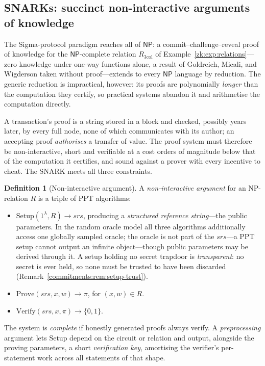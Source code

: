 \documentclass[11pt,a4paper]{article}
\theoremstyle{definition}
\newtheorem{definition}[theorem]{Definition}
\theoremstyle{remark}
\begin{document}
\subsection{SNARKs: succinct non-interactive arguments of knowledge}
\label{zk:subsec:snark}

The Sigma-protocol paradigm reaches all of \(\mathsf{NP}\): a
commit--challenge--reveal proof of knowledge for the
\(\mathsf{NP}\)-complete relation \(R_{3\mathrm{col}}\) of
Example~\ref{zk:exp:relations}---zero knowledge under one-way
functions alone, a result of Goldreich, Micali, and Wigderson taken
without proof---extends to every \(\mathsf{NP}\) language by
reduction. The generic reduction is impractical, however: its proofs
are polynomially \emph{longer} than the computation they certify, so
practical systems abandon it and arithmetise the computation
directly.

A transaction's proof is a string stored in a block and checked,
possibly years later, by every full node, none of which communicates
with its author; an accepting proof \emph{authorises} a transfer of
value. The proof system must therefore be non-interactive, short and
verifiable at a cost orders of magnitude below that of the computation
it certifies, and sound against a prover with every incentive to cheat.
The SNARK meets all three constraints.

\begin{definition}[Non-interactive argument]\label{zk:def:nizk}
A \emph{non-interactive argument} for an NP-relation \(R\) is a
triple of PPT algorithms:
\begin{itemize}
\item \(\mathrm{Setup}(1^{\lambda}, R) \to srs\), producing a
  \emph{structured reference string}---the public parameters. In
  the random oracle model all three algorithms additionally access
  one globally sampled oracle; the oracle is not part of the
  \(srs\)---a PPT setup cannot output an infinite object---though
  public parameters may be derived through it. A setup holding no
  secret trapdoor is \emph{transparent}: no secret is ever held, so
  none must be trusted to have been discarded
  (Remark~\ref{commitments:rem:setup-trust}).
\item \(\mathrm{Prove}(srs, x, w) \to \pi\), for
  \((x, w) \in R\).
\item \(\mathrm{Verify}(srs, x, \pi) \to \{0, 1\}\).
\end{itemize}
The system is \emph{complete} if honestly generated proofs always
verify. A \emph{preprocessing} argument lets \(\mathrm{Setup}\)
depend on the circuit or relation and output, alongside the proving
parameters, a short \emph{verification key}, amortising the
verifier's per-statement work across all statements of that shape.
\end{definition}
\end{document}
